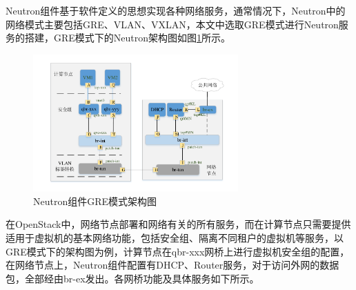 Neutron组件基于软件定义的思想实现各种网络服务，通常情况下，Neutron中的网络模式主要包括GRE、VLAN、VXLAN，本文中选取GRE模式进行Neutron服务的搭建，GRE模式下的Neutron架构图如图\ref{fig:neutron}所示。

\begin{figure}[!htb]
  \centering
  \includegraphics[width=0.7\textwidth]{logo/neutron}
  \caption{Neutron组件GRE模式架构图}
  \label{fig:neutron}
\end{figure}

在OpenStack中，网络节点部署和网络有关的所有服务，而在计算节点只需要提供适用于虚拟机的基本网络功能，包括安全组、隔离不同租户的虚拟机等服务，以GRE模式下的架构图为例，计算节点在qbr-xxx网桥上进行虚拟机安全组的配置，在网络节点上，Neutron组件配置有DHCP、Router服务，对于访问外网的数据包，全部经由br-ex发出。各网桥功能及具体服务如下所示。

